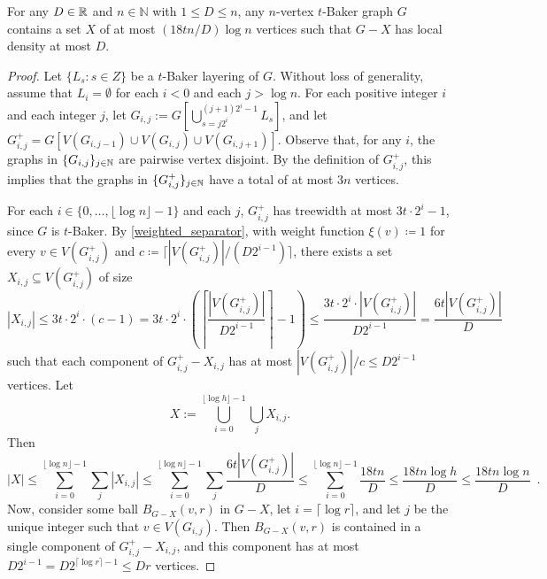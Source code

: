 \documentclass{patmorin}
\renewcommand{\le}{\leqslant}
\newcommand{\david}[1]{{\color{orange} David: #1}}
\newcommand{\NN}{\mathbb{N}}
\begin{document}







\begin{lem}\label{sparsifier_baker}
For any $D\in\mathbb{R}$ and $n\in\NN$ with $1\le D\le n$,
any $n$-vertex $t$-Baker graph $G$ contains a set $X$ of at most $(18tn/D)\log n$ vertices such that $G-X$ has local density at most $D$.
\end{lem}

\begin{proof}
  Let $\{L_s:s\in Z\}$ be a $t$-Baker layering of $G$.  Without loss of generality, assume that $L_i=\emptyset$ for each $i <0$ and each $j>\log n$.  For each positive integer $i$ and each integer $j$, let $G_{i,j}:=G[\bigcup_{s=j2^i}^{(j+1)2^i-1} L_s]$,  and let $G^+_{i,j}=G[V(G_{i,j-1})\cup V(G_{i,j})\cup V(G_{i,j+1})]$.  Observe that, for any $i$, the graphs in $\{ G_{i,j}\}_{j\in\mathbb{N}}$ are pairwise vertex disjoint.  By the definition of $G^+_{i,j}$, this implies that the graphs in $\{G^+_{i,j}\}_{j\in\mathbb{N}}$ have a total of at most $3n$ vertices.

  For each $i\in\{0,\ldots,\lfloor \log n\rfloor-1\}$ and each $j$, $G^+_{i,j}$ has treewidth at most $3t\cdot 2^i-1$, since $G$ is $t$-Baker.  By \cref{weighted_separator}, with weight function $\xi(v)\coloneqq 1$ for every $v\in V(G^+_{i,j})$ and $c \coloneqq \lceil |V(G^+_{i,j})|/(D2^{i-1})\rceil$, there exists a set $X_{i,j}\subseteq V(G^+_{i,j})$ of size
  \[
    |X_{i,j}|\le 3t\cdot 2^i\cdot(c-1) =
    3t\cdot 2^i\cdot\left(\left\lceil\frac{ |V(G^+_{i,j})|}{D2^{i-1}}\right\rceil-1\right) \le
    \frac{3t\cdot 2^i\cdot|V(G^+_{i,j})|}{ D2^{i-1}}
    = \frac{6t|V(G^+_{i,j})|}{D}
  \]
  such that each component of $G^+_{i,j}-X_{i,j}$ has at most $|V(G^+_{i,j})|/c \le D2^{i-1}$ vertices.  Let
  \[X:=\bigcup_{i=0}^{\lfloor\log h\rfloor-1}\bigcup_{j}X_{i,j}.\]
  Then
  \[
    |X| \le
    \sum_{i=0}^{\lfloor\log n\rfloor-1}\sum_{j} |X_{i,j}|
    \le
    \sum_{i=0}^{\lfloor\log n\rfloor-1}\sum_{j} \frac{6t|V(G^+_{i,j})|}{D}
    \le
    \sum_{i=0}^{\lfloor\log n\rfloor-1}\frac{18tn}{D}
    \le \frac{18tn\log h}{D}\le\frac{18tn\log n}{D}
    \enspace .
  \]
  Now, consider some ball $B_{G-X}(v,r)$ in $G-X$, let $i=\lceil\log r\rceil$, and let $j$ be the unique integer such that $v\in V(G_{i,j})$.  Then $B_{G-X}(v,r)$ is contained in a single component of $G^+_{i,j}-X_{i,j}$, and this component has at most $D2^{i-1}=D2^{\lceil\log r\rceil-1}\le Dr$ vertices.
\end{proof}
\end{document}
